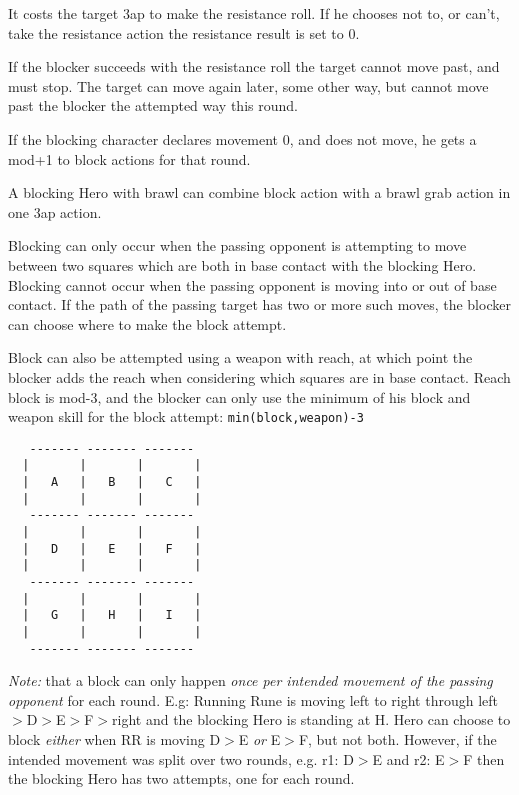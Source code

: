 It costs the target 3ap to make the resistance roll. If he chooses not to, or can't, take the resistance action the resistance result is set to 0.

If the blocker succeeds with the resistance roll the target cannot move past, and must stop. The target can move again later, some other way, but cannot move past the blocker the attempted way this round.

If the blocking character declares movement 0, and does not move, he gets a mod+1 to block actions for that round.

A blocking Hero with brawl can combine block action with a brawl grab action in one 3ap action.

Blocking can only occur when the passing opponent is attempting to move between two squares which are both in base contact with the blocking Hero. Blocking cannot occur when the passing opponent is moving into or out of base contact. If the path of the passing target has two or more such moves, the blocker can choose where to make the block attempt.

Block can also be attempted using a weapon with reach, at which point the blocker adds the reach when considering which squares are in base contact. Reach block is mod-3, and the blocker can only use the minimum of his block and weapon skill for the block attempt: \verb|min(block,weapon)-3|

\goodbreak
\begin{samepage}
\scriptsize \begin{verbatim}
   ------- ------- -------
  |       |       |       |
  |   A   |   B   |   C   |
  |       |       |       |
   ------- ------- -------
  |       |       |       |
  |   D   |   E   |   F   |
  |       |       |       |
   ------- ------- -------
  |       |       |       |
  |   G   |   H   |   I   |
  |       |       |       |
   ------- ------- -------
\end{verbatim} \normalsize
\end{samepage}

\emph{Note:} that a block can only happen \emph{once per intended movement of the passing opponent} for each round. E.g: Running Rune is moving left to right through left$>$D$>$E$>$F$>$right and the blocking Hero is standing at H. Hero can choose to block \emph{either} when RR is moving D$>$E \emph{or} E$>$F, but not both. However, if the intended movement was split over two rounds, e.g. r1: D$>$E and r2: E$>$F then the blocking Hero has two attempts, one for each round.

